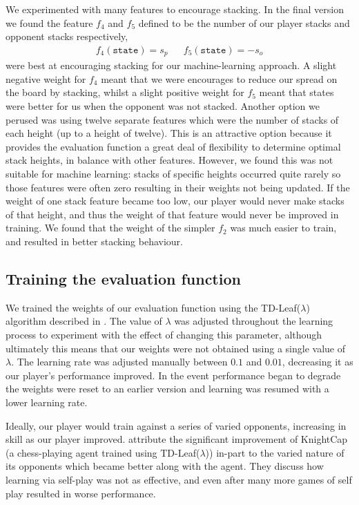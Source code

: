 \documentclass[11pt]{article}
\begin{document}
We experimented with many features to encourage stacking. In the final version we found the feature $f_4$ and $f_5$ defined to be the number of our player stacks and opponent stacks respectively,
\begin{align*}
    f_4(\texttt{state}) = s_p && f_5(\texttt{state}) = -s_o
\end{align*}
were best at encouraging stacking for our machine-learning approach. A slight negative weight for $f_4$ meant that we were encourages to reduce our spread on the board by stacking, whilst a slight positive weight for $f_5$ meant that states were better for us when the opponent was not stacked. Another option we perused was using twelve separate features which were the number of stacks of each height (up to a height of twelve). This is an attractive option because it provides the evaluation function a great deal of flexibility to determine optimal stack heights, in balance with other features. However, we found this was not suitable for machine learning: stacks of specific heights occurred quite rarely so those features were often zero resulting in their weights not being updated. If the weight of one stack feature became too low, our player would never make stacks of that height, and thus the weight of that feature would never be improved in training. We found that the weight of the simpler $f_2$ was much easier to train, and resulted in better stacking behaviour.

\subsection{Training the evaluation function} \label{sec:training}
We trained the weights of our evaluation function using the TD-Leaf($\lambda$) algorithm described in \cite{baxter_tdleaflambda_1999}. The value of $\lambda$ was adjusted throughout the learning process to experiment with the effect of changing this parameter, although ultimately this means that our weights were not obtained using a single value of $\lambda$. The learning rate was adjusted manually between $0.1$ and $0.01$, decreasing it as our player's performance improved. In the event performance began to degrade the weights were reset to an earlier version and learning was resumed with a lower learning rate.

Ideally, our player would train against a series of varied opponents, increasing in skill as our player improved. \cite{baxter_tdleaflambda_1999} attribute the significant improvement of KnightCap (a chess-playing agent trained using TD-Leaf($\lambda$)) in-part to the varied nature of its opponents which became better along with the agent. They discuss how learning via self-play was not as effective, and even after many more games of self play resulted in worse performance. 
\end{document}
